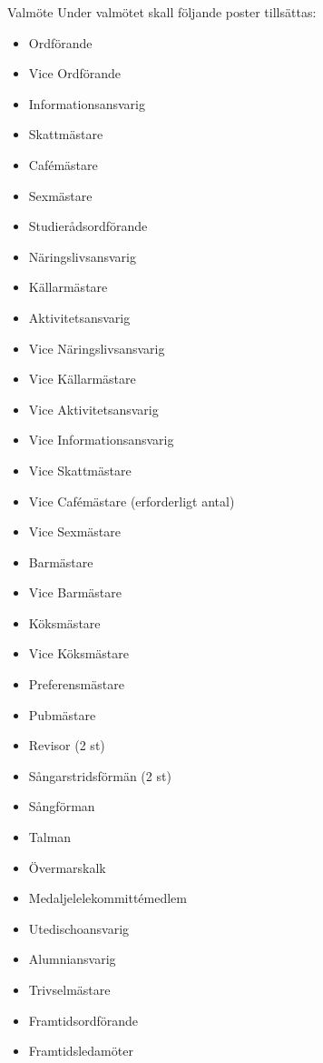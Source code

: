 \documentclass[pdfbookmarks,a4paper,11pt]{article}
\newlength{\itemcollength}
\newenvironment{reglemlista}{%
  \begin{list}{}{%
      \setlength{\labelwidth}{\itemcollength}%
      \setlength{\leftmargin}{\labelwidth + \labelsep}%
      \renewcommand{\makelabel}[1]{%
        \raisebox{0pt}[1ex][0pt]{%
          \makebox[\labelwidth][l]{%
            \parbox[t]{\itemcollength}{%
              \raggedright\hspace{0pt}##1}}}\hfill}%
      }}{%
  \end{list}}
\begin{document}
\begin{reglemlista}
	\item[Valmöte]
	Under valmötet skall följande poster tillsättas:
	\begin{itemize}
		\item Ordförande
		\item Vice Ordförande
		\item Informationsansvarig
		\item Skattmästare
		\item Cafémästare
		\item Sexmästare
		\item Studierådsordförande
		\item Näringslivsansvarig
		\item Källarmästare
		\item Aktivitetsansvarig
		\item Vice Näringslivsansvarig
		\item Vice Källarmästare
		\item Vice Aktivitetsansvarig
		\item Vice Informationsansvarig
		\item Vice Skattmästare
		\item Vice Cafémästare (erforderligt antal)
		\item Vice Sexmästare
		\item Barmästare
		\item Vice Barmästare
		\item Köksmästare
		\item Vice Köksmästare
		\item Preferensmästare
		\item Pubmästare
		\item Revisor (2 st)
		\item Sångarstridsförmän (2 st)
		\item Sångförman
		\item Talman
		\item Övermarskalk
		\item Medaljelelekommittémedlem
		\item Utedischoansvarig
		\item Alumniansvarig
		\item Trivselmästare
		\item Framtidsordförande
		\item Framtidsledamöter
	\end{itemize}

\end{reglemlista}

\end{document}
